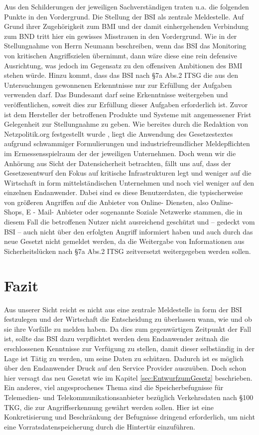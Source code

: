 \documentclass[a4paper,letterpaper,twocolumn,10pt,ngerman]{article}
\begin{document}
Aus den Schilderungen der jeweiligen Sachverständigen traten u.a. die folgenden Punkte in den Vordergrund. Die Stellung der BSI als zentrale Meldestelle. Auf Grund ihrer Zugehörigkeit zum BMI und der damit einhergehenden Verbindung zum BND tritt hier ein gewisses Misstrauen in den Vordergrund. Wie in der Stellungnahme von Herrn Neumann \cite[vlg.][S. 4]{NeuCCC15}  beschreiben, wenn das BSI das Monitoring von kritischen Angriffszielen übernimmt, dann wäre diese eine rein defensive Ausrichtung, was jedoch im Gegensatz zu den offensiven Ambitionen des BMI stehen würde. Hinzu kommt, dass das BSI nach §7a Abs.2 ITSG die aus den Untersuchungen gewonnenen Erkenntnisse nur zur Erfüllung der Aufgaben verwenden darf. Das Bundesamt darf seine Erkenntnisse weitergeben und veröffentlichen, soweit dies zur Erfüllung dieser Aufgaben erforderlich ist. Zuvor ist dem Hersteller der betroffenen Produkte und Systeme mit angemessener Frist Gelegenheit zur Stellungnahme zu geben. Wie bereites durch die Redaktion von Netzpolitik.org festgestellt wurde \cite{Bis15}, liegt die Anwendung des Gesetzestextes aufgrund schwammiger Formulierungen und industriefreundlicher Meldepflichten im Ermessensspielraum der der jeweiligen Unternehmen. 
Doch wenn wir die Anhörung aus Sicht der Datensicherheit betrachten, fällt uns auf, dass der Gesetzesentwurf den Fokus auf kritische Infrastrukturen legt und weniger auf die Wirtschaft in form mittelständischen Unternehmen und noch viel weniger auf den einzelnen Endanwender. Dabei sind es diese Benutzerdaten, die typischerweise von größeren Angriffen auf die Anbieter
von Online- Diensten, also Online- Shops, E - Mail- Anbieter oder sogenannte Soziale Netzwerke stammen, die in diesem Fall die betroffenen Nutzer nicht ausreichend geschützt und – gedeckt vom BSI – auch nicht über den erfolgten Angriff
informiert haben und auch durch das neue Gesetzt nicht gemeldet werden, da die Weitergabe von Informationen  aus Sicherheitslücken nach §7a Abs.2 ITSG zeitversetzt weitergegeben werden sollen.

\section{Fazit}
\label{sec:Fazit}
Aus unserer Sicht reicht es nicht aus eine zentrale Meldestelle in form der BSI festzulegen und der Wirtschaft die Entscheidung zu überlassen wann, wie und ob sie ihre Vorfälle zu melden haben. Da dies zum gegenwärtigen Zeitpunkt der Fall ist, \cite{Bis15} sollte das BSI dazu verpflichtet werden dem Endanwender zeitnah die erschlossenen Kenntnisse zur Verfügung zu stellen, damit dieser selbständig in der Lage ist Tätig zu werden, um seine Daten zu schützen. Dadurch ist es möglich über den Endanwender Druck auf den Service Provider auszuüben. Doch schon hier versagt das neu Gesetzt wie im Kapitel \ref{sec:EntwurfzumGesetz} beschrieben. Ein anderes, viel angesprochenes Thema sind die Speicherbefugnisse für Telemedien- und Telekommunikationsanbieter bezüglich Verkehrsdaten nach §100 TKG, die zur Angriffserkennung gewährt werden sollen. Hier ist eine Konkretisierung und Beschränkung der Befugnisse dringend erforderlich, um nicht eine Vorratsdatenspeicherung durch die Hintertür einzuführen. \cite{Bis15a}
\end{document}
